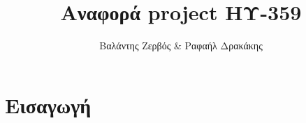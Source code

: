 
\title{Αναφορά project ΗΥ-359}
\author{Βαλάντης Ζερβός \& Ραφαήλ Δρακάκης}
\date{}



\maketitle

\section*{Εισαγωγή}
